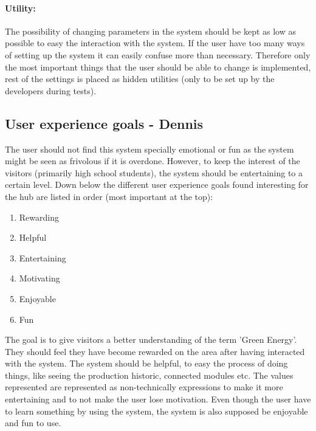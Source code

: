 \paragraph{Utility:}
The possibility of changing parameters in the system should be kept as low as possible to easy the interaction with the system. If the user have too many ways of setting up the system it can easily confuse more than necessary. Therefore only the most important things that the user should be able to change is implemented, rest of the settings is placed as hidden utilities (only to be set up by the developers during tests). 
\subsection{User experience goals - Dennis}
The user should not find this system specially emotional or fun as the system might be seen as frivolous if it is overdone. However, to keep the interest of the visitors (primarily high school students), the system should be entertaining to a certain level.  
Down below the different user experience goals found interesting for the hub are listed in order (most important at the top):
\begin{enumerate}
	\item Rewarding
	\item Helpful
	\item Entertaining
	\item Motivating
	\item Enjoyable
	\item Fun
\end{enumerate}
The goal is to give visitors a better understanding of the term 'Green Energy'. They should feel they have become rewarded on the area after having interacted with the system. The system should be helpful, to easy the process of doing things, like seeing the production historic, connected modules etc. The values represented are represented as non-technically expressions to make it more entertaining and to not make the user lose motivation. Even though the user have to learn something by using the system, the system is also supposed be enjoyable and fun to use.


